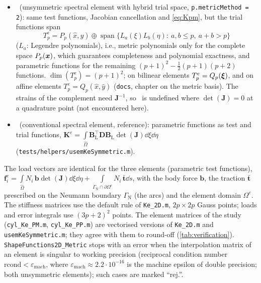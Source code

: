 \begin{itemize}
  of the interpolation matrix, not the trial space, so all errors are those of the monomial
  basis up to round-off.
\item \PH\ (unsymmetric spectral element with hybrid trial space,
  \texttt{p.metricMethod = 2}): same test functions, Jacobian cancellation and
  \eqref{eq:Kpm}, but the trial functions span
  \begin{equation}
    T_p^e=P_p(\hat x,\hat y)\oplus\operatorname{span}\{L_a(\xi)L_b(\eta):\ a,b\le p,\ a+b>p\}
    \label{eq:hybrid}
  \end{equation}
  ($L_a$: Legendre polynomials), i.e., metric polynomials only for the complete space
  $P_p(\bm{x})$, which guarantees completeness and polynomial exactness, and parametric
  functions for the remaining $(p+1)^2-\tfrac12(p+1)(p+2)$ functions. $\dim(T_p^e)=(p+1)^2$; on
  bilinear elements $T_p^e=Q_p(\bm{\xi})$, and on affine elements $T_p^e=Q_p(\hat x,\hat y)$
  (\texttt{docs}, chapter on the metric basis). The strains of the complement need
  $\bm J^{-1}$, so \PH\ is undefined where $\det(\bm J)=0$ at a quadrature point (not encountered
  here).
\item \PP\ (conventional spectral element, reference): parametric functions as
  test and trial functions, $\bm K^e=\int\limits_{\hat\Omega}\bm B_{\mathrm L}^\top\bm D\bm B_{\mathrm L}\det(\bm
  J)\dd\xi\dd\eta$ (\texttt{tests/helpers/usemKeSymmetric.m}).
\end{itemize}
The load vectors are identical for the three elements (parametric test functions),
$\bm f_i^e=\int\limits_{\hat\Omega}N_i\,\bm b\det(\bm J)\dd\xi\dd\eta
+\int\limits_{\Gamma_{\mathrm N}\cap\partial\Omega^e}N_i\,\bar{\bm t}\dd s$, with the body force
$\bm b$, the traction $\bar{\bm t}$ prescribed on the Neumann boundary $\Gamma_{\mathrm N}$ (the
arcs) and the element domain $\Omega^e$.
The stiffness matrices use the default rule of \texttt{Ke\_2D.m}, $2p\times2p$
Gauss points; loads and error integrals use $(3p+2)^2$ points. The element
matrices of the study (\texttt{cyl\_Ke\_PM.m}, \texttt{cyl\_Ke\_PP.m}) are
vectorised versions of \texttt{Ke\_2D.m} and \texttt{usemKeSymmetric.m}; they agree
with them to round-off (\cref{tab:verification}). \texttt{ShapeFunctions2D\_Metric} stops with an
error when the interpolation matrix of an element is singular to working precision
(reciprocal condition number $\mathrm{rcond}<\varepsilon_{\mathrm{mach}}$, where
$\varepsilon_{\mathrm{mach}}\approx2.2\cdot10^{-16}$ is the machine epsilon of double precision;
both unsymmetric elements); such cases are marked ``rej.''.

